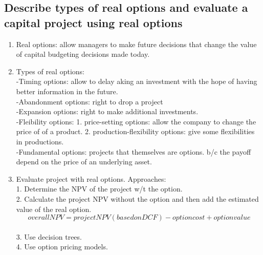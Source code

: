 \documentclass{article}
\newcommand{\be}{\begin{enumerate}}
\newcommand{\ee}{\end{enumerate}}
\begin{document}
\subsection{Describe types of real options and evaluate a capital project using real
options}
\be
    \item Real options: allow managers to make future decisions that change the
        value of capital budgeting decisions made today.
    \item Types of real options:
        \\-Timing options: allow to delay aking an investment with the hope of having
        better information in the future.
        \\-Abandonment options: right to drop a project
        \\-Expansion options: right to make additional investments.
        \\-Fleibility options: 1. price-setting options: allow the company to change the price of
        of a product. 2. production-flexibility options: give some flexibilities in productions.
        \\-Fundamental options: projects that themselves are options. b/c the payoff
        depend on the price of an underlying asset.
    \item Evaluate project with real options. Approaches:
        \\1. Determine the NPV of the project w/t the option.
        \\2. Calculate the project NPV without the option and then add the 
        estimated value of the real option. 
        $$
            overall NPV = project NPV(based on DCF) - option cost + option value
        $$
        \\3. Use decision trees.
        \\4. Use option pricing models.
\ee
\end{document}
